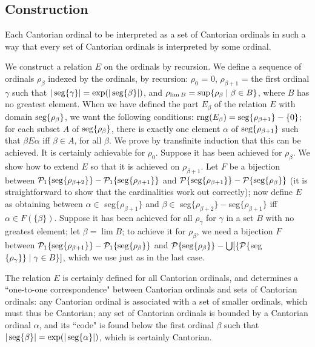 \subsection *{Construction}
Each Cantorian ordinal to be interpreted as a set of
Cantorian ordinals in such a way that every set of Cantorian ordinals
is interpreted by some ordinal.

We construct a relation $E$ on the ordinals by recursion.  We define a sequence of
ordinals $\rho_{\beta}$ indexed by the ordinals, by recursion: $\rho_0$ 
= 0, $\rho_{\beta+1}$ = the first ordinal $\gamma$ such that
$|\mathop{\mathrm{seg}}\{\gamma\}| = \exp(|\mathop{\mathrm{seg}}\{\beta\}|)$,
and $\rho_{\lim B} = \sup \{\rho_{\beta} \mid \beta \in B\}$,
where $B$ has no greatest element.
When we have defined the part $E_{\beta}$ of the relation $E$ with
domain $\mathop{\mathrm{seg}}\{\rho_{\beta}\}$, we want the following conditions:
$\mathop{\mathrm{rng}}(E_{\beta}) = \mathop{\mathrm{seg}}\{\rho_{\beta + 1}\} -
\{0\}$; for each subset $A$ of $\mathop{\mathrm{seg}}\{\rho_{\beta}\}$, there is
exactly one element $\alpha$ of
$\mathop{\mathrm{seg}}\{\rho_{\beta+1}\}$ such that $\beta E \alpha$ iff $\beta
\in A$, for all $\beta$.  We prove by
transfinite induction that this can be achieved.
It is certainly achievable for $\rho_{0}$.  Suppose it
has been achieved for $\rho_{\beta}$.  We show how to extend $E$ so that it is
achieved on $\rho_{\beta+1}$.  Let $F$ be a bijection between ${\cal
P}_1\{\mathop{\mathrm{seg}}\{\rho_{\beta+2}\}\} -
{\cal P}_1\{\mathop{\mathrm{seg}}\{\rho_{\beta+1}\}\}$ and ${\cal P}\{\mathop{\mathrm{seg}}\{\rho_{\beta+1}\}\} -
{\cal P}\{\mathop{\mathrm{seg}}\{\rho_{\beta}\}\}$ (it is straightforward
to show that the cardinalities work out correctly); now
define $E$ as obtaining between $\alpha \in$
seg$\{\rho_{\beta+1}\}$ and $\beta \in$
seg$\{\rho_{\beta+2}\}-$seg$\{\rho_{\beta+1}\}$ iff $\alpha \in F(\{\beta\})$.
Suppose it has been achieved for all $\rho_{\gamma}$ for $\gamma$ in a set $B$
with no greatest element; let $\beta = \lim B$; to achieve it for
$\rho_{\beta}$, we need a bijection $F$ between ${\cal
P}_1\{\mathop{\mathrm{seg}}\{\rho_{\beta+1}\}\} - {\cal P}_1\{\mathop{\mathrm{seg}}\{\rho_{\beta}\}\}$ and
${\cal P}\{\mathop{\mathrm{seg}}\{\rho_{\beta}\}\} - 
\bigcup[\{{\cal P}\{$seg$\{\rho_{\gamma}\}\} \mid \gamma \in B\}]$, which we use
just as in the last case.


The relation $E$ is certainly defined for all
Cantorian ordinals, and
determines a ``one-to-one correspondence" between Cantorian ordinals and sets
of Cantorian ordinals:  any Cantorian ordinal is associated with a
set of smaller ordinals, which must thus 
be Cantorian; any set of Cantorian ordinals is bounded by a Cantorian
ordinal $\alpha$, and its ``code" is found below the first ordinal $\beta$ such
that $|\mathop{\mathrm{seg}}\{\beta\}| = \exp(|\mathop{\mathrm{seg}}\{\alpha\}|)$, which is
certainly Cantorian.


